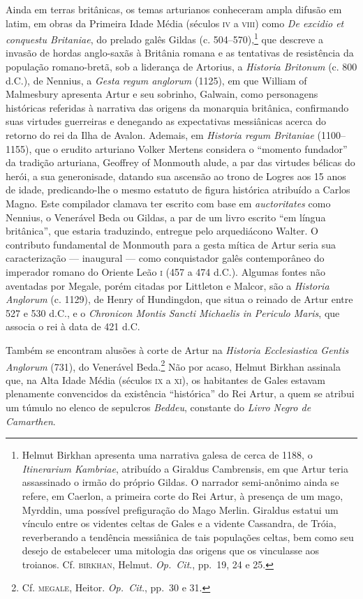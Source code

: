Ainda em terras britânicas, os temas arturianos conheceram ampla difusão
em latim, em obras da Primeira Idade Média (séculos \textsc{iv} a \textsc{viii}) como
\textit{De excidio et conquestu Britaniae}, do prelado galês Gildas (c.
504--570),\footnote{ Helmut Birkhan apresenta uma narrativa galesa de
cerca de 1188, o \textit{Itinerarium Kambriae}, atribuído a Giraldus
Cambrensis, em que Artur teria assassinado o irmão do próprio Gildas. O
narrador semi-anônimo ainda se refere, em Caerlon, a primeira corte do
Rei Artur, à presença de um mago, Myrddin, uma possível prefiguração do
Mago Merlin. Giraldus estatui um vínculo entre os videntes celtas de
Gales e a vidente Cassandra, de Tróia, reverberando a tendência
messiânica de tais populações celtas, bem como seu desejo de
estabelecer uma mitologia das origens que os vinculasse aos troianos.
Cf. \textsc{birkhan}, Helmut. \textit{Op.~Cit}., pp.~19, 24 e 25.} que
descreve a invasão de hordas anglo-saxãs à Britânia romana e as
tentativas de resistência da população romano-bretã, sob a liderança de
Artorius, a \textit{Historia Britonum} (c. 800 d.C.), de Nennius, a
\textit{Gesta regum anglorum} (1125), em que William of Malmesbury
apresenta Artur e seu sobrinho, Galwain, como personagens históricas
referidas à narrativa das origens da monarquia britânica, confirmando
suas virtudes guerreiras e denegando as expectativas messiânicas acerca
do retorno do rei da Ilha de Avalon. Ademais, em \textit{Historia regum
Britaniae} (1100--1155), que o erudito arturiano Volker Mertens
considera o “momento fundador” da tradição arturiana, Geoffrey of
Monmouth alude, a par das virtudes bélicas do herói, a sua
generonisade, datando sua ascensão ao trono de Logres aos 15 anos de
idade, predicando-lhe o mesmo estatuto de figura histórica atribuído a
Carlos Magno. Este compilador clamava ter escrito com base em
\textit{auctoritates} como Nennius, o Venerável Beda ou Gildas, a par
de um livro escrito “em língua britânica”, que estaria traduzindo,
entregue pelo arquediácono Walter. O contributo fundamental de Monmouth
para a gesta mítica de Artur seria sua caracterização --- inaugural ---
como conquistador galês contemporâneo do imperador romano do Oriente
Leão \textsc{i} (457 a 474 d.C.). Algumas fontes não aventadas por Megale, porém
citadas por Littleton e Malcor, são a \textit{Historia Anglorum} (c.
1129), de Henry of Hundingdon, que situa o reinado de Artur entre 527 e
530 d.C., e o \textit{Chronicon Montis Sancti Michaelis in Periculo
Maris}, que associa o rei à data de 421 d.C. 

Também se encontram alusões à corte de Artur na \textit{Historia
Ecclesiastica Gentis Anglorum} (731), do Venerável Beda.\footnote{ Cf.
\textsc{megale}, Heitor. \textit{Op.~Cit}., pp.~30 e 31.} Não por acaso,
Helmut Birkhan assinala que, na Alta Idade Média (séculos \textsc{ix} a \textsc{xi}), os
habitantes de Gales estavam plenamente convencidos da existência
“histórica” do Rei Artur, a quem se atribui um túmulo no elenco de
sepulcros \textit{Beddeu}, constante do \textit{Livro Negro de
Camarthen}. 

